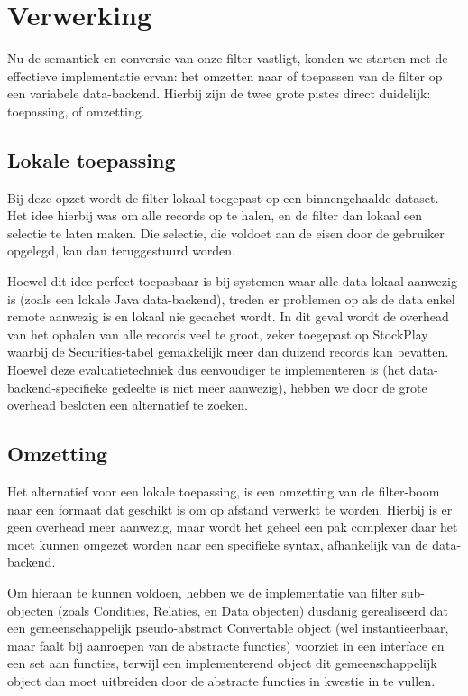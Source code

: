 \section{Verwerking}

Nu de semantiek en conversie van onze filter vastligt, konden we starten met de effectieve implementatie ervan: het omzetten naar of toepassen van de filter op een variabele data-backend. Hierbij zijn de twee grote pistes direct duidelijk: toepassing, of omzetting.

\subsection{Lokale toepassing}

Bij deze opzet wordt de filter lokaal toegepast op een binnengehaalde dataset. Het idee hierbij was om alle records op te halen, en de filter dan lokaal een selectie te laten maken. Die selectie, die voldoet aan de eisen door de gebruiker opgelegd, kan dan teruggestuurd worden.

Hoewel dit idee perfect toepasbaar is bij systemen waar alle data lokaal aanwezig is (zoals een lokale Java data-backend), treden er problemen op als de data enkel remote aanwezig is en lokaal nie gecachet wordt. In dit geval wordt de overhead van het ophalen van alle records veel te groot, zeker toegepast op StockPlay waarbij de Securities-tabel gemakkelijk meer dan duizend records kan bevatten. Hoewel deze evaluatietechniek dus eenvoudiger te implementeren is (het data-backend-specifieke gedeelte is niet meer aanwezig), hebben we door de grote overhead besloten een alternatief te zoeken.

\subsection{Omzetting}

Het alternatief voor een lokale toepassing, is een omzetting van de filter-boom naar een formaat dat geschikt is om op afstand verwerkt te worden. Hierbij is er geen overhead meer aanwezig, maar wordt het geheel een pak complexer daar het moet kunnen omgezet worden naar een specifieke syntax, afhankelijk van de data-backend.

Om hieraan te kunnen voldoen, hebben we de implementatie van filter sub-objecten (zoals Condities, Relaties, en Data objecten) dusdanig gerealiseerd dat een gemeenschappelijk pseudo-abstract Convertable object (wel instantieerbaar, maar faalt bij aanroepen van de abstracte functies) voorziet in een interface en een set aan functies, terwijl een implementerend object dit gemeenschappelijk object dan moet uitbreiden door de abstracte functies in kwestie in te vullen.

